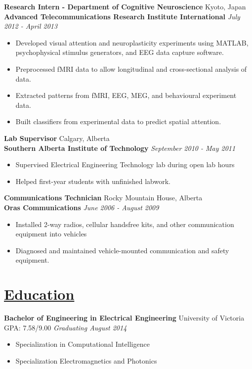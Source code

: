 \documentclass[a4paper, 11pt]{article}
\begin{document}
  \textbf{Research Intern - Department of Cognitive Neuroscience}
  \hfill
  Kyoto, Japan\\
  \textbf{Advanced Telecommunications Research Institute International}
  \hfill
  \emph{July 2012 - April 2013}
  \begin{itemize}[nosep]
    \item Developed visual attention and neuroplasticity experiments using MATLAB, psychophysical stimulus generators, and EEG data capture software.
    \item Preprocessed fMRI data to allow longitudinal and cross-sectional analysis of data.
    \item Extracted patterns from fMRI, EEG, MEG, and behavioural experiment data.
    \item Built classifiers from experimental data to predict spatial attention.
  \end{itemize}
  \medskip

  \textbf{Lab Supervisor}
  \hfill
  Calgary, Alberta\\
  \textbf{Southern Alberta Institute of Technology}
  \hfill
  \emph{September 2010 - May 2011}
  \begin{itemize}[nosep]
    \item Supervised Electrical Engineering Technology lab during open lab hours
    \item Helped first-year students with unfinished labwork.
  \end{itemize}
  \medskip

  \textbf{Communications Technician}
  \hfill
  Rocky Mountain House, Alberta \\
  \textbf{Oras Communications}
  \hfill
  \emph{June 2006 - August 2009}
  \begin{itemize}[nosep]
  \item Installed 2-way radios, cellular handsfree kits, and other communication equipment into vehicles
  \item Diagnosed and maintained vehicle-mounted communication and safety equipment.
  \end{itemize}  

\section{\underline{Education}}
  \textbf{Bachelor of Engineering in Electrical Engineering}
  \hfill
  University of Victoria\\
  GPA: 7.58/9.00
  \hfill
  \emph{Graduating August 2014}
  \begin{itemize}[nosep]
    \item Specialization in Computational Intelligence
    \item Specialization Electromagnetics and Photonics
  \end{itemize}
  \medskip
  
\end{document}
